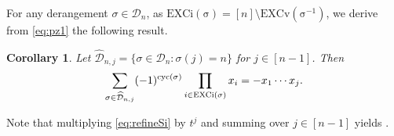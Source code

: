\documentclass[12pt,reqno]{amsart}
\numberwithin{equation}{section}
\newcommand\cyc{\mathop{ \rm cyc}}
\newcounter{num}
\def\D{\mathcal{D}}
\def\cyc{\mathop{\rm cyc}}
\newtheorem{lem}{Lemma}
\newtheorem{cor}{Corollary}
\begin{document}
For any derangement  $\sigma \in\D_{n}$, as 
 $\mathrm{EXCi(\sigma)}=[n]\setminus\mathrm{EXCv(\sigma^{-1})}$, 
 we derive from \eqref{eq:pz1} the following result.
\begin{cor}\label{conj1}
Let $\widehat{\D}_{n,j}=\{\sigma\in \D_n: \sigma(j)=n\}$ for $j\in [n-1]$. Then 
\begin{align}\label{eq:refineSi}
\sum_{\sigma\in \widehat{\D}_{n,j}}(-1)^{\cyc (\sigma)}
 \prod_{i\in \mathrm{EXCi}(\sigma)}x_i   
=-x_1\cdots x_j.
\end{align}
\end{cor}
Note that multiplying \eqref{eq:refineSi} by $t^j$ and  summing over $j\in [n-1]$ yields \cite[Theorem~7]{Si16}.

%
%
\end{document}
